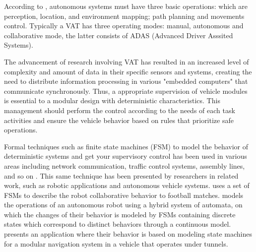 \documentclass[conference]{IEEEtran}
\begin{document}
According to \cite{autonomous_siegwart2011introduction}, autonomous systems must have three basic operations: which are perception, location, and environment mapping; path planning and movements control. Typically a VAT has three operating modes: manual, autonomous and collaborative mode, the latter consists of ADAS (Advanced Driver Asssited Systems).


The advancement of research involving VAT has resulted in an increased level of complexity and amount of data in their specific sensors and systems, creating the need to distribute information processing in various "embedded computers" that communicate synchronously. Thus, a appropriate supervision of vehicle modules is essential to a modular design with deterministic characteristics. This management should perform the control according to the needs of each task activities and ensure the vehicle behavior based on rules that prioritize safe operations.


Formal techniques such as finite state machines (FSM) to model the behavior of deterministic systems and get your supervisory control has been used in various areas including network communication, traffic control systems, assembly lines, and so on \cite{event_comparative_study} \cite{event_des_line_945770}. This same technique has been presented by researchers in related work, such as robotic applications and autonomous vehicle systems. \cite{event_supervisory_soccer_994642} uses a set of FSMs to describe the robot collaborative behavior to football matches. \cite{event_hybrid_automata_827799} models the operations of an autonomous robot using a hybrid system of automata, on which the changes of their behavior is modeled by FSMs containing discrete states which correspond to distinct behaviors through a continuous model. \cite{event_modular_navigation} presents an application where their behavior is based on modeling state machines for a modular navigation system in a vehicle that operates under tunnels.
\end{document}
